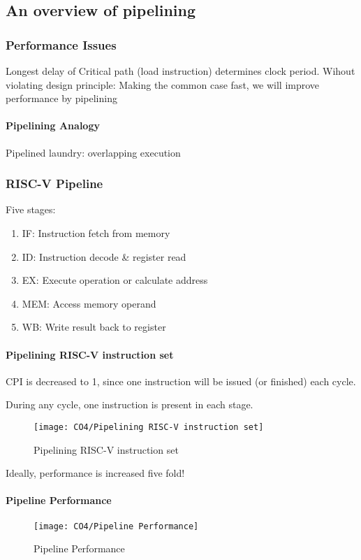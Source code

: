 \subsection{An overview of pipelining}

\subsubsection{Performance Issues}
Longest delay of Critical path (load instruction) determines clock period. Wihout violating design principle: Making the common case fast, we will improve performance by pipelining

\paragraph{Pipelining Analogy}
Pipelined laundry: overlapping execution

\subsubsection{RISC-V Pipeline}
Five stages:
\begin{enumerate}\small
    \item IF: Instruction fetch from memory
    \item ID: Instruction decode \& register read
    \item EX: Execute operation or calculate address
    \item MEM: Access memory operand
    \item WB: Write result back to register    
\end{enumerate}

\paragraph{Pipelining RISC-V instruction set}
CPI is decreased to 1, since one instruction will be issued (or finished) each cycle. 

During any cycle, one instruction is present in each stage.

\begin{figure}[!htb]
    \centering
    \texttt{[image: CO4/Pipelining RISC-V instruction set]}
    \caption{Pipelining RISC-V instruction set}
\end{figure}

Ideally, performance is increased five fold!

\paragraph{Pipeline Performance}
\begin{figure}[!htb]   
    \centering
    \texttt{[image: CO4/Pipeline Performance]}
    \caption{Pipeline Performance}
\end{figure}

